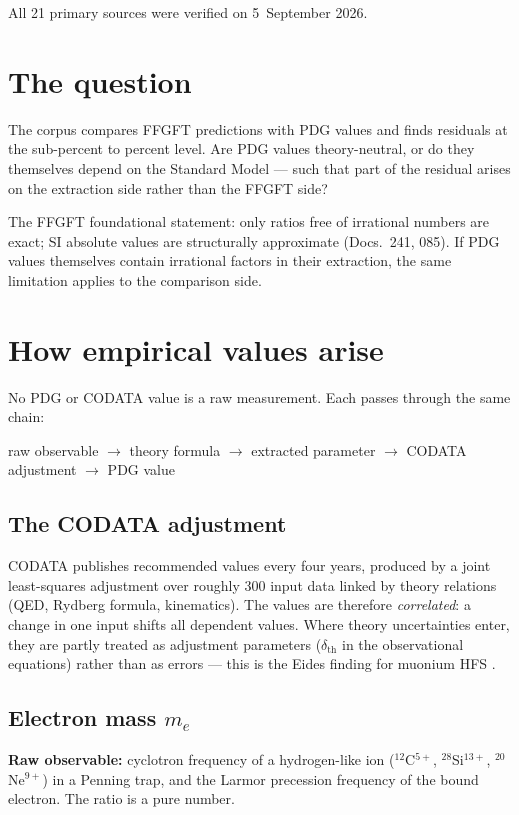 All 21 primary sources were verified on 5~September 2026.

\section{The question}

The corpus compares FFGFT predictions with PDG values and finds residuals at the sub-percent to percent level. Are PDG values theory-neutral, or do they themselves depend on the Standard Model --- such that part of the residual arises on the extraction side rather than the FFGFT side?

The FFGFT foundational statement: only ratios free of irrational numbers are exact; SI absolute values are structurally approximate (Docs.~241, 085). If PDG values themselves contain irrational factors in their extraction, the same limitation applies to the comparison side.

\section{How empirical values arise}

No PDG or CODATA value is a raw measurement. Each passes through the same chain:
\begin{center}
raw observable $\to$ theory formula $\to$ extracted parameter $\to$ CODATA adjustment $\to$ PDG value
\end{center}

\subsection{The CODATA adjustment}

CODATA publishes recommended values every four years, produced by a joint least-squares adjustment over roughly 300 input data linked by theory relations (QED, Rydberg formula, kinematics). The values are therefore \emph{correlated}: a change in one input shifts all dependent values. Where theory uncertainties enter, they are partly treated as adjustment parameters ($\delta_\text{th}$ in the observational equations) rather than as errors --- this is the Eides finding for muonium HFS \QM.

\subsection{Electron mass $m_e$}

\textbf{Raw observable:} cyclotron frequency of a hydrogen-like ion ($^{12}$C$^{5+}$, $^{28}$Si$^{13+}$, $^{20}$Ne$^{9+}$) in a Penning trap, and the Larmor precession frequency of the bound electron. The ratio is a pure number.

